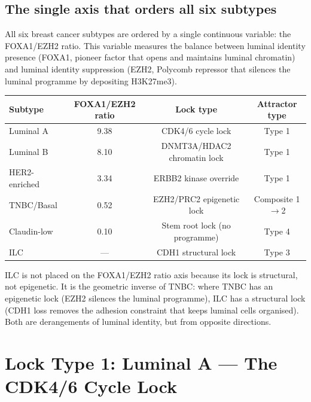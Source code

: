 \documentclass[12pt, a4paper]{article}
\begin{document}
\subsection{The single axis that orders all six subtypes}

All six breast cancer subtypes are ordered by a single
continuous variable: the FOXA1/EZH2 ratio. This variable
measures the balance between luminal identity presence
(FOXA1, pioneer factor that opens and maintains luminal
chromatin) and luminal identity suppression (EZH2,
Polycomb repressor that silences the luminal programme
by depositing H3K27me3).

\begin{center}
\begin{tabular}{lccc}
\toprule
\textbf{Subtype} & \textbf{FOXA1/EZH2 ratio}
& \textbf{Lock type} & \textbf{Attractor type} \\
\midrule
Luminal A     & 9.38 & CDK4/6 cycle lock & Type 1 \\
Luminal B     & 8.10 & DNMT3A/HDAC2 chromatin lock
                     & Type 1 \\
HER2-enriched & 3.34 & ERBB2 kinase override
                     & Type 1 \\
TNBC/Basal    & 0.52 & EZH2/PRC2 epigenetic lock
                     & Composite 1$\rightarrow$2 \\
Claudin-low   & 0.10 & Stem root lock (no programme)
                     & Type 4 \\
ILC           & ---  & CDH1 structural lock
                     & Type 3 \\
\bottomrule
\end{tabular}
\end{center}

\noindent ILC is not placed on the FOXA1/EZH2 ratio axis
because its lock is structural, not epigenetic. It is the
geometric inverse of TNBC: where TNBC has an epigenetic
lock (EZH2 silences the luminal programme), ILC has a
structural lock (CDH1 loss removes the adhesion
constraint that keeps luminal cells organised). Both
are derangements of luminal identity, but from opposite
directions.

\section{Lock Type 1: Luminal A --- The CDK4/6 Cycle Lock}
\end{document}
